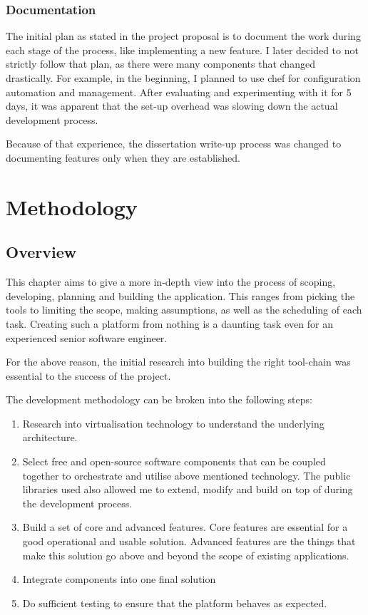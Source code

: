 \documentclass{article}
\begin{document}
\subsubsection{Documentation}
The initial plan as stated in the project proposal is to document the work during each stage of the process, like implementing a new feature. I later decided to not strictly follow that plan, as there were many components that changed drastically. For example, in the beginning, I planned to use chef for configuration automation and management. After evaluating and experimenting with it for 5 days, it was apparent that the set-up overhead was slowing down the actual development process. 

Because of that experience, the dissertation write-up process was changed to documenting features only when they are established.


\newpage
\section{Methodology}
\subsection{Overview}
This chapter aims to give a more in-depth view into the process of scoping, developing, planning and building the application. This ranges from picking the tools to limiting the scope, making assumptions, as well as the scheduling of each task. Creating such a platform from nothing is a daunting task even for an experienced senior software engineer.

For the above reason, the initial research into building the right tool-chain was essential to the success of the project.

The development methodology can be broken into the following steps:
\begin{enumerate}
    \item
          Research into virtualisation technology to understand the underlying architecture.

    \item
          Select free and open-source software components that can be coupled together to orchestrate and utilise above mentioned technology. The public libraries used also allowed me to extend, modify and build on top of during the development process.

    \item
          Build a set of core and advanced features. Core features are essential for a good operational and usable solution. Advanced features are the things that make this solution go above and beyond the scope of existing applications.

    \item
          Integrate components into one final solution

    \item
          Do sufficient testing to ensure that the platform behaves as expected.
\end{enumerate}
\end{document}
